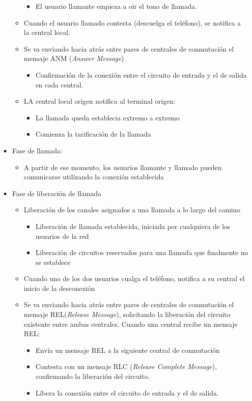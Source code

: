\documentclass[10pt,portrait, twocolumn]{article}
\begin{document}
\begin{itemize}
\begin{itemize}
\begin{itemize}
				\item El usuario llamante empieza a oir el tono de llamada.
				\end{itemize}
			\item Cuando el usuario llamado contesta (descuelga el teléfono), se notifica a la central local.
			\item Se va enviando hacia atrás entre pares de centrales de conmutación el mensaje ANM (\textit{Answer Message}) 
				\begin{itemize}
				\item Confirmación de la conexión entre el circuito de entrada y el de salida en cada central.
				\end{itemize} 
			\item LA central local origen notifica al terminal origen:
				\begin{itemize}
				\item La llamada queda establecia extremo a extremo
				\item Comienza la tarificación de la llamada
				\end{itemize} 
		\end{itemize} 
	\item Fase de llamada:
		\begin{itemize}
		\item A partir de ese momento, los usuarios llamante y llamado pueden comunicarse utilizando la conexión establecida
		\end{itemize}
	\item Fase de liberación de llamada
		\begin{itemize}
		\item Liberación de los canales asignados a una llamada a lo largo del camino
			\begin{itemize}
			\item Liberación de llamada establecida, iniciada por cualquiera de los usuarios de la red
			\item Liberación de circuitos reservados para una llamada que finalmente no se establece
			\end{itemize}
		\item Cuando uno de los dos usuarios cualga el teléfono, notifica a su central el inicio de la desconexión
		\item Se va enviando hacia atrás entre pares de centrales de conmutación el mensaje REL(\textit{Release Message}), solicitando la liberación del circuito existente entre ambas centrales. Cuando una central recibe un mensaje REL:
			\begin{itemize}
			\item Envía un mensaje REL a la siguiente central de conmutación
			\item Contesta con un mensaje RLC (\textit{Release Complete Message}), confirmando la liberación del circuito.
			\item Libera la conexión entre el circuito de entrada y el de salida.
			\end{itemize}
		\end{itemize}
	\end{itemize}
\end{document}
